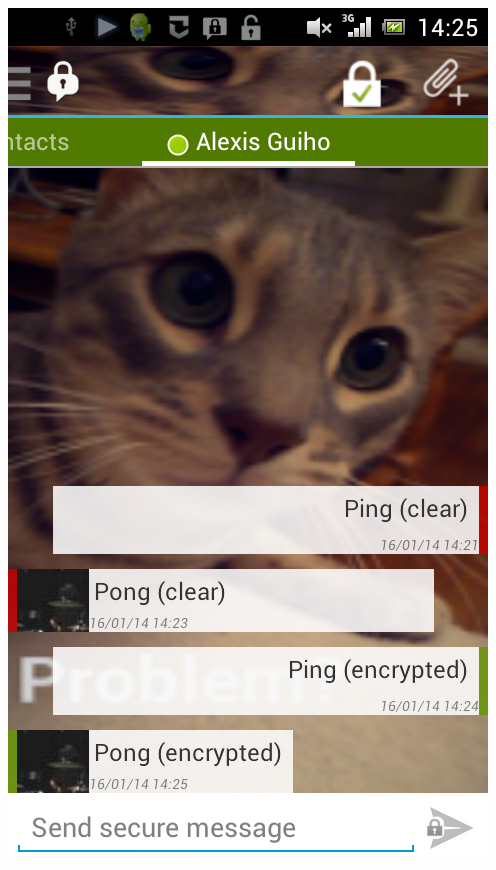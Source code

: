 \begin{frame}
\begin{columns}[c]
    \includegraphics[height=.9\textheight]{./materials/chat_secure_conv}
\end{columns}
\end{frame}
